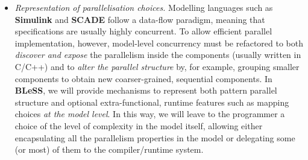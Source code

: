 \documentclass[a4paper,11pt]{article}
\newcommand{\project}[1]{\textbf{#1}\xspace}
\newcommand{\BLESS}{\project{BLeSS}}
\newcommand{\TheProject}{\BLESS}
\begin{document}
\begin{itemize}
\item \textit{Representation of parallelisation choices.} Modelling
  languages such as \textbf{Simulink} and \textbf{SCADE} follow a data-flow paradigm,
  meaning that specifications are usually highly concurrent. To allow
  efficient parallel implementation, however, model-level concurrency 
  must be refactored to both \emph{discover and expose} the parallelism 
  inside the components (usually written in C/C++) and to \emph{alter
  the parallel structure} by, for example, grouping smaller components 
  to obtain new coarser-grained, sequential components. In \TheProject,
  we will provide mechanisms to represent both pattern parallel structure
  and optional extra-functional, runtime features such as mapping choices 
  \emph{at the model level}. In this way, we will leave to the programmer
  a choice of the level of complexity in the model itself, allowing either
  encapsulating all the parallelism properties in the model or
  delegating some (or most) of them to the compiler/runtime system.
  
  

\end{itemize}
\end{document}
